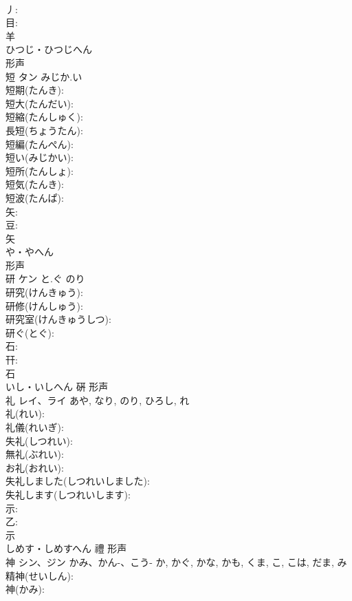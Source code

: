 \documentclass[8pt]{extreport}
\begin{document}
\begin{CJK}{UTF8}{min}
\\	丿: 
\\	目: 
\\	羊	
\\	ひつじ・ひつじへん	
\\	形声 
\\	短	タン	みじか.い		
\\	短期(たんき): 
\\	短大(たんだい): 
\\	短縮(たんしゅく): 
\\	長短(ちょうたん): 
\\	短編(たんぺん): 
\\	短い(みじかい): 
\\	短所(たんしょ): 
\\	短気(たんき): 
\\	短波(たんぱ): 
\\	矢: 
\\	豆: 
\\	矢	
\\	や・やへん	
\\	形声 
\\	研	ケン	と.ぐ	のり	
\\	研究(けんきゅう): 
\\	研修(けんしゅう): 
\\	研究室(けんきゅうしつ): 
\\	研ぐ(とぐ): 
\\	石: 
\\	幵: 
\\	石	
\\	いし・いしへん	硏	形声 
\\	礼	レイ、ライ		あや, なり, のり, ひろし, れ	
\\	礼(れい): 
\\	礼儀(れいぎ): 
\\	失礼(しつれい): 
\\	無礼(ぶれい): 
\\	お礼(おれい): 
\\	失礼しました(しつれいしました): 
\\	失礼します(しつれいします): 
\\	示: 
\\	乙: 
\\	示	
\\	しめす・しめすへん	禮	形声 
\\	神	シン、ジン	かみ、かん-、こう-	か, かぐ, かな, かも, くま, こ, こは, だま, み	
\\	精神(せいしん): 
\\	神(かみ): 

\end{CJK}
\end{document}

